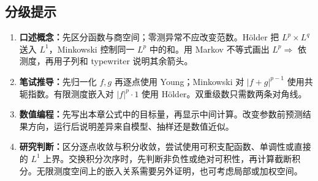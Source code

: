 \subsection*{分级提示}
\begingroup\small
\begin{enumerate}[nosep,leftmargin=*]
  \item \textbf{口述概念：}先区分函数与商空间；零测异常不应改变范数。Hölder 把 $L^p\times L^q$ 送入 $L^1$，Minkowski 控制同一 $L^p$ 中的和。用 Markov 不等式画出 $L^p\Rightarrow$ 依测度，再用子列和 typewriter 说明其余箭头。
  \item \textbf{笔试推导：}先归一化 $f,g$ 再逐点使用 Young；Minkowski 对 $|f+g|^{p-1}$ 使用共轭指数。有限测度嵌入对 $|f|^p\cdot1$ 使用 Hölder。双重级数只需数两条对角线。
  \item \textbf{数值编程：}先写出本章公式中的目标量，再显示中间计算。改变参数前预测结果方向，运行后说明差异来自模型、抽样还是数值近似。
  \item \textbf{研究判断：}区分逐点收敛与积分收敛，尝试使用可积支配函数、单调性或直接的 $L^1$ 上界。交换积分次序时，先判断非负性或绝对可积性，再计算截断积分。无限测度空间上的嵌入关系需要另外证明，也可考虑局部或加权空间。
\end{enumerate}
\endgroup
